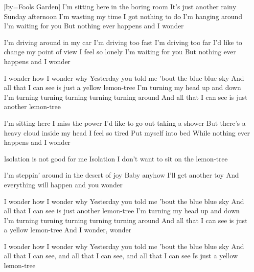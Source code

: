 [by={Fools Garden}]
\beginverse
I'm sitting here in the boring room
It's just another rainy Sunday afternoon
I'm wasting my time
I got nothing to do
I'm hanging around
I'm waiting for you
But nothing ever happens and I wonder
\endverse

\beginverse
I'm driving around in my car
I'm driving too fast
I'm driving too far
I'd like to change my point of view
I feel so lonely
I'm waiting for you
But nothing ever happens and I wonder
\endverse

\beginchorus
I wonder how
I wonder why
Yesterday you told me 'bout the blue blue sky
And all that I can see is just a yellow lemon-tree
I'm turning my head up and down
I'm turning turning turning turning turning around
And all that I can see is just another lemon-tree
\endchorus

\beginverse
I'm sitting here
I miss the power
I'd like to go out taking a shower
But there's a heavy cloud inside my head 
I feel so tired
Put myself into bed
While nothing ever happens and I wonder
\endverse

\beginverse
Isolation is not good for me
Isolation I don't want to sit on the lemon-tree
\endverse

\beginverse
I'm steppin' around in the desert of joy
Baby anyhow I'll get another toy
And everything will happen and you wonder
\endverse

\beginchorus
I wonder how
I wonder why
Yesterday you told me 'bout the blue blue sky
And all that I can see is just another lemon-tree
I'm turning my head up and down
I'm turning turning turning turning turning around
And all that I can see is just a yellow lemon-tree
And I wonder, wonder
\endchorus

\beginchorus
I wonder how
I wonder why
Yesterday you told me 'bout the blue blue sky
And all that I can see, and all that I can see, and all that I can see
Is just a yellow lemon-tree
\endchorus
\endsong
